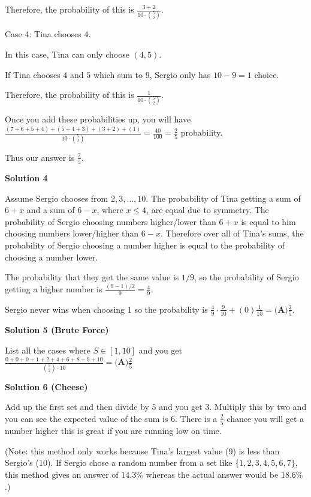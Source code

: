 \begin{enumerate}
 Therefore, the probability of this is $\frac{3+2}{10 \cdot \binom{5}{2}}$.

 Case 4: Tina chooses $4$.

 In this case, Tina can only choose $(4,5).$

 If Tina chooses $4$ and $5$ which sum to $9$, Sergio only has $10-9=1$ choice.

 Therefore, the probability of this is $\frac{1}{10 \cdot \binom{5}{2}}$.

 Once you add these probabilities up, you will have $\frac{(7+6+5+4)+(5+4+3)+(3+2)+(1)}{10 \cdot\binom{5}{2}} = \frac{40}{100} = \frac{2}{5}$ probability.

 Thus our answer is $\frac{2}{5}$.

 



\textbf{Solution 4}

Assume Sergio chooses from ${2,3,\ldots,10}$. The probability of Tina getting a sum of $6+x$ and a sum of $6-x$, where $x \leq 4$, are equal due to symmetry. The probability of Sergio choosing numbers higher/lower than $6+x$ is equal to him choosing numbers lower/higher than $6-x$. Therefore over all of Tina's sums, the probability of Sergio choosing a number higher is equal to the probability of choosing a number lower. 

 The probability that they get the same value is $1/9$, so the probability of Sergio getting a higher number is $\frac{(9-1)/2}{9} = \frac49$. 

 Sergio never wins when choosing $1$ so the probability is $\frac49 \cdot \frac{9}{10} + (0)\frac{1}{10} = \boxed{\textbf{(A)} \frac{2}{5}}.$




\textbf{Solution 5 (Brute Force)}

List all the cases where $S \in [1, 10]$ and you get $\frac{0+0+0+1+2+4+6+8+9+10}{\binom{5}{2} \cdot 10} = \boxed{\textbf{(A)} \frac{2}{5}}$




\textbf{Solution 6 (Cheese)}

Add up the first set and then divide by $5$ and you get $3$. Multiply this by two and you can see the expected value of the sum is $6$. There is a $\frac{2}{5}$ chance you will get a number higher this is great if you are running low on time.

 (Note: this method only works because Tina's largest value ($9$) is less than Sergio's ($10$). If Sergio chose a random number from a set like $\{1, 2, 3, 4, 5, 6, 7\}$, this method gives an answer of $14.3 \%$ whereas the actual answer would be $18.6 \%$.)


\end{enumerate}
